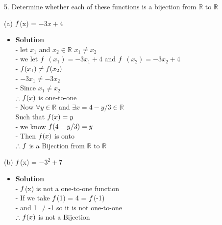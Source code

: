 \documentclass[11pt]{article}
\begin{document}
\begin{enumerate}

\begin{flushleft}
{\large 5. Determine whether each of these functions is a bijection from $\mathbb{R}$ to $\mathbb{R}$}\\
\end{flushleft}



\large (a) $\mathnormal{f}$(x) = $-3x + 4$\\

\begin{itemize}
\item \textbf{Solution}\\
\large - let $x_1$ and $x_2 \in \mathbb{R}$ \mid $ x_1 \neq x_2$\\
\large - we let  $\mathnormal{f}$ $(x_1) = -3x_1+4$ and $\mathnormal{f}$ $(x_2) = -3x_2+4$\\
\large - $\mathnormal{f}(x_1) \neq \mathnormal{ f}(x_2)$\\
\large - $-3x_1 \neq -3x_2$\\
\large - Since $x_1 \neq x_2$ \\
\large $\therefore \mathnormal{f}(x)$ is one-to-one\\
\large - Now $\forall y \in \mathbb{R}$ and $\exists x = 4-y/3 \in \mathbb{R}$ \\
\large Such that $ \mathnormal{f}(x) = y$\\
\large - we know $\mathnormal{f}(4-y/3) = y$\\
\large - Then $ \mathnormal{f}(x)$ is onto\\
\large $\therefore \mathnormal{f}$ is a Bijection from $\mathbb{R}$ to $\mathbb{R}$\\


\end {itemize}
\end {enumerate}



\begin{enumerate}
\begin{flushleft}
\end{flushleft}
\large (b) $\mathnormal{f}$(x) = $-3^2+7$\\

\begin{itemize}
\item \textbf{Solution}\\
\large - $\mathnormal{f}$(x) is not a one-to-one function\\
\large - If we take $\mathnormal{f}$(1) = 4 = $\mathnormal{f}$(-1)\\
\large - and 1 $\neq$-1 so it is not one-to-one\\
\large $\therefore \mathnormal{f}(x)$ is not a Bijection\\


\end {itemize}
\end {enumerate}
\end{document}
